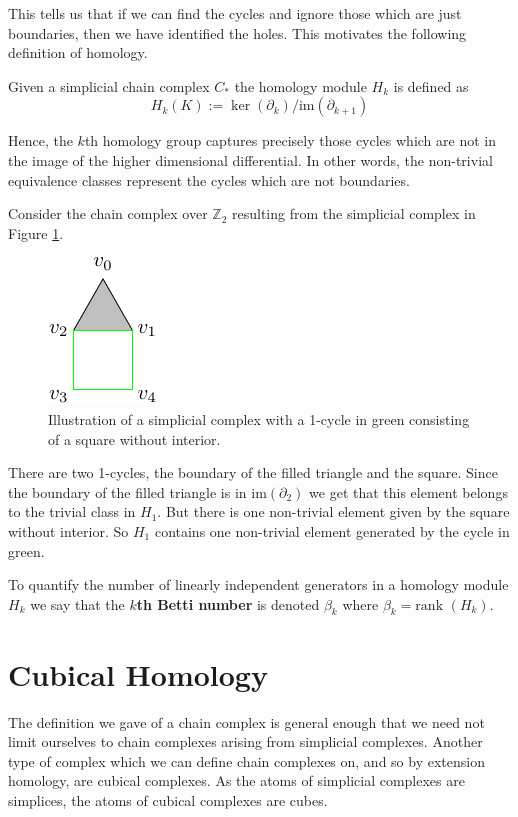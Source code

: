This tells us that if we can find the cycles and ignore those which are just boundaries, then we have identified the holes. This motivates the following definition of homology.
\begin{definition}
  Given a simplicial chain complex \hspace{0.05cm}$C_{*}$ the homology module $H_{k}$ is defined as
  \[H_{k}(K) := \ker(\partial_{k})/\text{im}(\partial_{k+1})\]
\end{definition}
Hence, the $k$th homology group captures precisely those cycles which are not in the image of the higher dimensional differential. In other words, the non-trivial equivalence classes represent the cycles which are not boundaries.
\begin{example}
Consider the chain complex over $\mathbb{Z}_{2}$ resulting from the simplicial complex in Figure \ref{trihom}.
\begin{figure}[ht]
  \centering
  \includegraphics[scale=2]{trisquarefilled.pdf}
  \caption{\label{trihom} Illustration of a simplicial complex with a 1-cycle in green consisting of a square without interior.}
\end{figure}
There are two 1-cycles, the boundary of the filled triangle and the square. Since the boundary of the filled triangle is in $\text{im} (\partial_{2})$ we get that this element belongs to the trivial class in $H_{1}$. But there is one non-trivial element given by the square without interior. So $H_{1}$ contains one non-trivial element generated by the cycle in green.

To quantify the number of linearly independent generators in a homology module $H_{k}$ we say that the \textbf{$k$th Betti number} is denoted $\beta_{k}$ where $\beta_{k} = \text{rank }(H_{k})$.

\section{Cubical Homology}
The definition we gave of a chain complex is general enough that we need not limit ourselves to chain complexes arising from simplicial complexes. Another type of complex which we can define chain complexes on, and so by extension homology, are cubical complexes. As the atoms of simplicial complexes are simplices, the atoms of cubical complexes are cubes.


\end{example}
